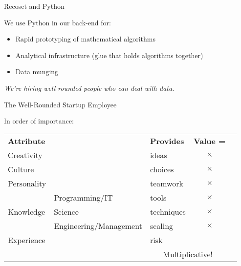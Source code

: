 \documentclass{beamer}
\begin{document}
\begin{frame}{Recoset and Python}

  We use Python in our back-end for:
  \begin{itemize}
  \item Rapid prototyping of mathematical algorithms
  \item Analytical infrastructure (glue that holds algorithms together)
  \item Data munging
  \end{itemize}

  \vskip 1cm

  \textit{We're hiring \alert{well rounded} people who can deal with data.}
  
\end{frame}

\begin{frame}{The Well-Rounded Startup Employee}

In order of importance:
\vskip 0.5cm

\begin{centering}

\begin{tabular}{lllcl}
\textbf{Attribute}       &  &  \textbf{Provides}  & \textbf{Value =} & \vspace{0.5cm} \\

Creativity                 & &  ideas        & $\times$ & \\ 
Culture                    & &  choices      & $\times$ & \\ 
Personality                & & teamwork     & $\times$ & \vspace{0.5cm} \\

& Programming/IT             &  tools        & $\times$ & \\
Knowledge & Science                    &  techniques   & $\times$ & \\
& Engineering/Management     &  scaling      & $\times$ & \vspace{0.5cm} \\ 

Experience                 & & risk         & \vspace{0.5cm} \\
& & \multicolumn{2}{c}{\alert{Multiplicative!}}
\end{tabular}

\end{centering}

\end{frame}
\end{document}
